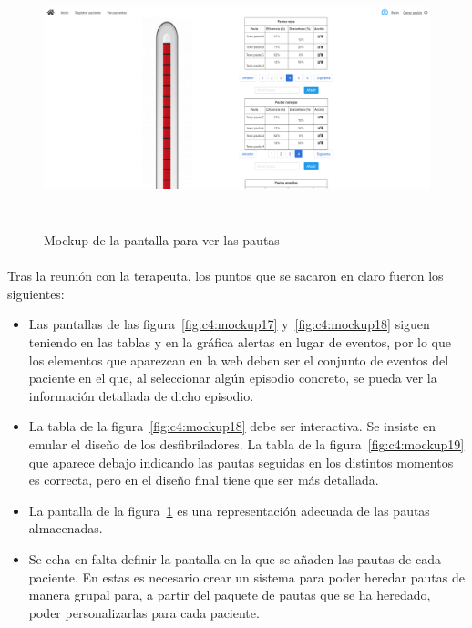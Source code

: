 \begin{figure}[!htbp]
    \centering
    \includegraphics[height=7.5cm, width=\textwidth]{Imagenes/anxA20.png}
    \caption[Mockup de la pantalla para ver las pautas]{Mockup de la pantalla para ver las pautas}
    \label{fig:c4:mockup31}
\end{figure}

\paragraph{}
Tras la reunión con la terapeuta, los puntos que se sacaron en claro fueron los siguientes:

\begin{itemize}
    \item Las pantallas de las figura~\ref{fig:c4:mockup17} y~\ref{fig:c4:mockup18}  siguen teniendo en las tablas y en la gráfica alertas en lugar de eventos, por lo que los elementos que aparezcan en la web deben ser el conjunto de eventos del paciente en el que, al seleccionar algún episodio concreto, se pueda ver la información detallada de dicho episodio.
    \item La tabla de la figura~\ref{fig:c4:mockup18} debe ser interactiva. Se insiste en emular el diseño de los desfibriladores. La tabla de la figura~\ref{fig:c4:mockup19} que aparece debajo indicando las pautas seguidas en los distintos momentos es correcta, pero en el diseño final tiene que ser más detallada.
    \item La pantalla de la figura~\ref{fig:c4:mockup31} es una representación adecuada de las pautas almacenadas.
    \item Se echa en falta definir la pantalla en la que se añaden las pautas de cada paciente. En estas es necesario crear un sistema para poder heredar pautas de manera grupal para, a partir del paquete de pautas que se ha heredado, poder personalizarlas para cada paciente.
\end{itemize}


